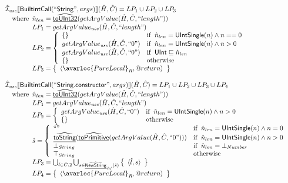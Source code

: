 \[\begin{array}{l}
\aI_{\it use}\lbr \SF{BuiltintCall}(``\SF{String}",args)\rbr(\hat{H},\hat{C}) = LP_1 \cup LP_2 \cup LP_3\\
\quad\wherec{
  \hat{n}_{len} = \ahf{toUInt32}(getArgValue(\hat{H}, \hat{C}, ``length"))\\
  LP_1 = getArgValue_{\it use}(\hat{H}, \hat{C}, ``length")\\
  LP_2 = \left\{\begin{array}{ll}
      \set{}
      & \ifc{\hat{n}_{len} = \SF{UIntSingle}(n) \land n == 0}\\
      getArgValue_{\it use}(\hat{H}, \hat{C}, ``0")
      & \ifc{\hat{n}_{len} = \SF{UIntSingle}(n) \land n > 0}\\
      getArgValue_{\it use}(\hat{H}, \hat{C}, ``0")
      & \ifc{\SF{UInt} \sqsubseteq \hat{n}_{len}}\\
      \set{} & \owc
    \end{array}\right.\\
  LP_3 = \set{\langle\avarloc{PureLocal}_R,\varprop{return}\rangle}\\
  }\\
\\  
  
\aI_{\it use}\lbr \SF{BuiltintCall}(``\SF{String.constructor}",args)\rbr(\hat{H},\hat{C}) = LP_1 \cup LP_2 \cup LP_3 \cup LP_4\\
\quad\wherec{
  \hat{n}_{len} = \ahf{toUInt32}(getArgValue(\hat{H}, \hat{C}, ``length"))\\
  LP_1 = getArgValue_{\it use}(\hat{H}, \hat{C}, ``length")\\
  LP_2 = \left\{\begin{array}{ll}
      getArgValue_{\it use}(\hat{H}, \hat{C}, ``0")
      & \ifc{\hat{n}_{len} = \SF{UIntSingle}(n) \land n > 0}\\
      \set{} & \owc
    \end{array}\right.\\
  \hat{s} = \left\{\begin{array}{ll}
      \hat{``"}
      & \ifc{\hat{n}_{len} = \SF{UIntSingle}(n) \land n = 0}\\
      \ahf{toString}(\ahf{toPrimitive}(getArgValue(\hat{H}, \hat{C}, ``0")))
      & \ifc{\hat{n}_{len} = \SF{UIntSingle}(n) \land n > 0}\\
      \bot_{String} & \ifc{\hat{n}_{len} = \bot_{Number}}\\
      \top_{String} & \owc
    \end{array}\right.\\
  LP_3 = \bigcup_{\hat{l} \in \hat{C}.2} \bigcup_{s \in \ahf{NewString}_{\it def}(\hat{s})}
    \set{\langle \hat{l}, s \rangle}\\
  LP_4 = \set{\langle\avarloc{PureLocal}_R,\varprop{return}\rangle}\\
  }\\
\\



\end{array}\]
